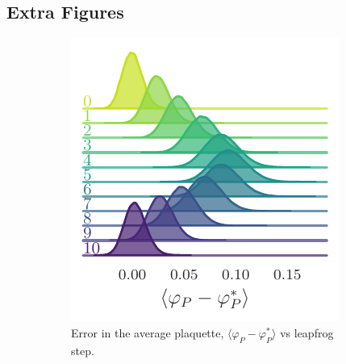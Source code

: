 \documentclass{article} %
\begin{document}
{\subsection{\label{subsec:extra_figures}Extra Figures}
\begin{figure}[htpb]
   \centering
   \begin{subfigure}{0.31\textwidth}
      \includegraphics[width=\textwidth]{figures/2021-03-09/plaqsf_1758.pdf}
      \caption{\label{fig:plaqsf}Error in the average plaquette, \(\langle\varphi_{P}-\varphi_{P}^{*}\rangle\) vs
      leapfrog step.}
   \end{subfigure}
   \hfill
   \begin{subfigure}{0.31\textwidth}

\end{subfigure}
\end{figure}}
\end{document}
